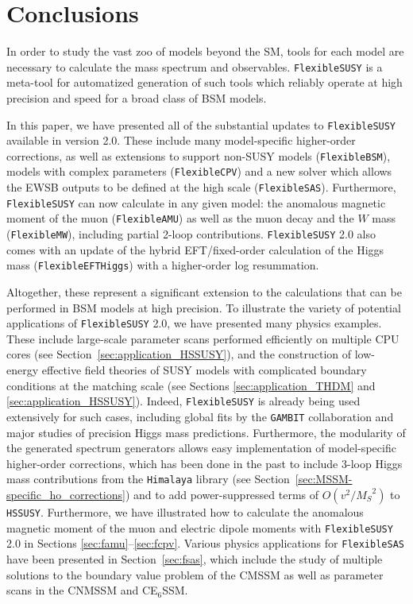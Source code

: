 \documentclass[final,3p,11pt,pdflatex]{elsarticle}
\makeatletter
\newcommand{\modelname}[1]{\texttt{#1}\@\xspace}
\newcommand{\fs}{\texttt{FlexibleSUSY}\@\xspace}
\newcommand{\HSSUSY}{\modelname{HSSUSY}}
\newcommand{\Himalaya}{\texttt{Himalaya}\@\xspace}
\newcommand{\GAMBIT}{\texttt{GAMBIT}\@\xspace}
\newcommand{\fstwo}{\fs 2.0\@\xspace}
\newcommand{\fbsm}{\texttt{FlexibleBSM}\@\xspace}
\newcommand{\fcpv}{\texttt{FlexibleCPV}\@\xspace}
\newcommand{\fmw}{\texttt{FlexibleMW}\@\xspace}
\newcommand{\famu}{\texttt{FlexibleAMU}\@\xspace}
\newcommand{\fsas}{\texttt{FlexibleSAS}\@\xspace}
\newcommand{\feft}{\texttt{Flex\-ib\-le\-EFT\-Higgs}\@\xspace}
\newcommand{\ESSM}{E$_6$SSM\@\xspace}
\newcommand{\MS}{\ensuremath{M_S}\xspace}
\newcommand{\secref}[1]{Section~\ref{#1}}
\makeatother
\begin{document}
\section{Conclusions}
\label{sec:conclusions}

In order to study the vast zoo of models beyond the SM,
tools for each model are necessary to calculate the mass spectrum and observables.
\fs is a meta-tool for automatized generation of such tools which reliably operate at high precision and speed
for a broad class of BSM models.

In this paper, we have presented all of the substantial updates to \fs
available in version 2.0.  These include many model-specific
higher-order corrections, as well as extensions to support non-SUSY
models (\fbsm), models with complex parameters (\fcpv) and a new
solver which allows the EWSB
outputs to be defined at the high scale (\fsas).  Furthermore, \fs can
now calculate in any given
model: the anomalous magnetic moment of the muon (\famu) as well as the muon decay and the $W$ mass (\fmw),
including partial 2-loop contributions.  \fstwo also comes with an
update of the hybrid EFT/fixed-order calculation of the Higgs mass
(\feft) with a higher-order log resummation.

Altogether, these represent a significant extension to the
calculations that can be performed in BSM models at high precision. To
illustrate the variety of potential applications of \fstwo, we have
presented many physics examples.  These include large-scale parameter
scans performed efficiently on multiple CPU cores (see
\secref{sec:application_HSSUSY}), and the construction of low-energy
effective field theories of SUSY models with complicated boundary
conditions at the matching scale (see Sections
\ref{sec:application_THDM} and \ref{sec:application_HSSUSY}).  Indeed,
\fs is already being used extensively for such cases, including global
fits by the \GAMBIT collaboration and major studies of precision Higgs
mass predictions.  Furthermore, the modularity of the generated
spectrum generators allows easy implementation of model-specific
higher-order corrections, which has been done in the past to include
3-loop Higgs mass contributions from the \Himalaya library (see
\secref{sec:MSSM-specific_ho_corrections}) and to add power-suppressed
terms of $O(v^2/\MS^2)$ to \HSSUSY.
Furthermore, we have illustrated how to calculate the anomalous
magnetic moment of the muon and electric dipole moments with \fstwo in
Sections \ref{sec:famu}--\ref{sec:fcpv}.  Various physics applications
for \fsas have been presented in \secref{sec:fsas}, which include the
study of multiple solutions to the boundary value problem of the CMSSM
as well as parameter scans in the CNMSSM and C\ESSM.
\end{document}
